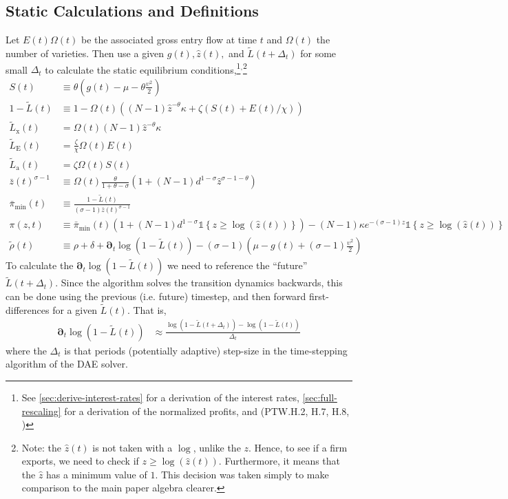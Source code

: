 \documentclass[11pt]{article}
\newcommand{\D}[1][]{\ensuremath{\boldsymbol{\partial}_{#1}}}
\newcommand{\indicator}[1]{\ensuremath{\mathds{1}\left\{{#1}\right\}}}
\begin{document}
\subsection{Static Calculations and Definitions}
Let $E(t)\Omega(t)$ be the associated gross entry flow at time $t$ and $\Omega(t)$ the number of varieties.  Then use a given $g(t), \hat{z}(t),$ and  $\tilde{L}(t+\Delta_t)$ for some small $\Delta_t$ to calculate the static equilibrium conditions,\footnote{See \cref{sec:derive-interest-rates} for a derivation of the interest rates, \cref{sec:full-rescaling} for a derivation of the normalized profits, and (PTW.H.2, H.7, H.8, )}${}^{,}$\footnote{Note: the $\hat{z}(t)$ is not taken with a $\log$, unlike the $z$.  Hence, to see if a firm exports, we need to check if $z \geq \log(\hat{z}(t))$.  Furthermore, it means that the $\hat{z}$ has a minimum value of $1$.  This decision was taken simply to make comparison to the main paper algebra clearer.}
\begin{align}
	S(t) &\equiv \theta \left( g(t) - \mu - \theta\frac{\upsilon^2}{2}\right)\\
	1 - \tilde{L}(t) &\equiv 1 - \Omega(t)\left((N -1)\hat{z}^{-\theta}\kappa + \zeta \left(S(t) + E(t)/\chi \right)\right)\\
	\tilde{L}_{\text{x}}(t) &= \Omega(t) (N -1)\hat{z}^{-\theta}\kappa\\
	\tilde{L}_{\text{E}}(t) &= \frac{\zeta}{\chi}\Omega(t) E(t)\\
	\tilde{L}_{\text{a}}(t) &= \zeta \Omega(t) S(t)\\
	\bar{z}(t)^{\sigma - 1}&\equiv \Omega(t)
\frac{\theta}{1+\theta - \sigma}\left(1 + (N-1)d^{1-\sigma}\hat{z}^{\sigma - 1 -\theta} \right)\\
	\bar{\pi}_{\min}(t) &\equiv \frac{1-\tilde{L}(t)}{(\sigma-1)\bar{z}(t)^{\sigma-1}}\\
	\pi(z,t) &\equiv \bar{\pi}_{\min}(t)\left(1 + (N-1)d^{1-\sigma}\indicator{z \geq \log(\hat{z}(t))}\right) - (N-1)\kappa e^{-(\sigma - 1)z}\indicator{z \geq \log(\hat{z}(t))}\\
	\tilde{\rho}(t) &\equiv \rho+ \delta + \D[t]\log\left(1 - \tilde{L}(t)\right) - (\sigma - 1)\left(\mu - g(t) + (\sigma - 1)\frac{\upsilon^2}{2} \right)
\end{align}
To calculate the $\D[t]\log\left(1 - \tilde{L}(t)\right)$ we need to reference the ``future'' $\tilde{L}(t+\Delta_t)$.  Since the algorithm solves the transition dynamics backwards, this can be done using the previous (i.e. future) timestep, and then forward first-differences for a given $\tilde{L}(t)$.  That is,
\begin{align}
	\D[t]\log\left(1 - \tilde{L}(t)\right) &\approx \frac{\log\left(1 - \tilde{L}(t+\Delta_t)\right) - \log\left(1 - \tilde{L}(t)\right)}{\Delta_t}
\end{align}
where the $\Delta_t$ is that periods (potentially adaptive) step-size in the time-stepping algorithm of the DAE solver.
\end{document}
